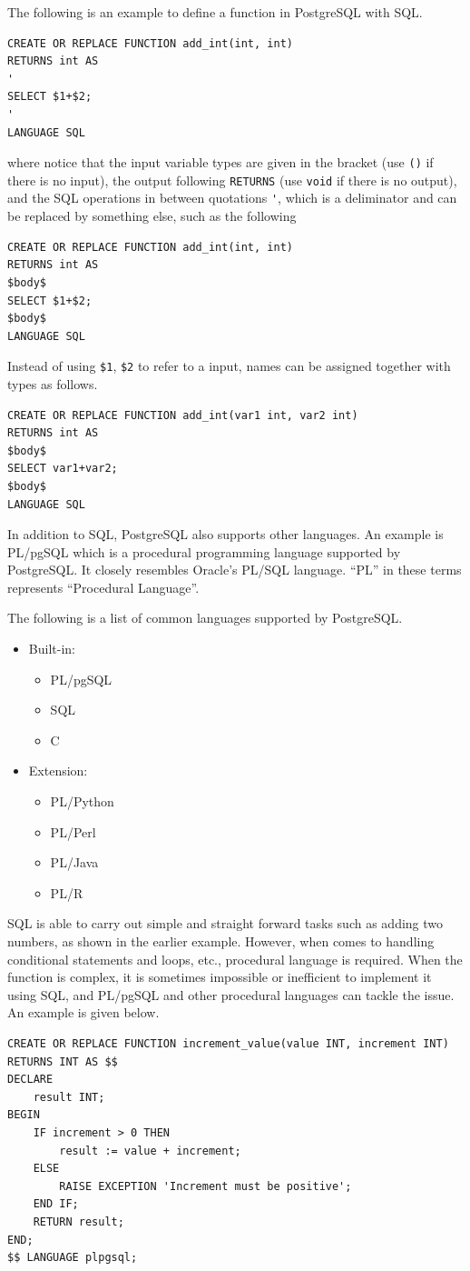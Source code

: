 The following is an example to define a function in PostgreSQL with SQL.
\begin{lstlisting}
CREATE OR REPLACE FUNCTION add_int(int, int)
RETURNS int AS
'
SELECT $1+$2;
'
LANGUAGE SQL
\end{lstlisting}
where notice that the input variable types are given in the bracket (use \verb|()| if there is no input), the output following \verb|RETURNS| (use \verb|void| if there is no output), and the SQL operations in between quotations \verb|'|, which is a deliminator and can be replaced by something else, such as the following
\begin{lstlisting}
CREATE OR REPLACE FUNCTION add_int(int, int)
RETURNS int AS
$body$
SELECT $1+$2;
$body$
LANGUAGE SQL
\end{lstlisting}

Instead of using \verb|$1|, \verb|$2| to refer to a input, names can be assigned together with types as follows.
\begin{lstlisting}
CREATE OR REPLACE FUNCTION add_int(var1 int, var2 int)
RETURNS int AS
$body$
SELECT var1+var2;
$body$
LANGUAGE SQL
\end{lstlisting}

In addition to SQL, PostgreSQL also supports other languages. An example is PL/pgSQL which is a procedural programming language supported by PostgreSQL. It closely resembles Oracle's PL/SQL language. ``PL'' in these terms represents ``Procedural Language''.

The following is a list of common languages supported by PostgreSQL.
\begin{itemize}
	\item Built-in:
	\begin{itemize}
		\item PL/pgSQL
		\item SQL
		\item C
	\end{itemize}
	\item Extension:
	\begin{itemize}
		\item PL/Python
		\item PL/Perl
		\item PL/Java
		\item PL/R
	\end{itemize}
\end{itemize}

SQL is able to carry out simple and straight forward tasks such as adding two numbers, as shown in the earlier example. However, when comes to handling conditional statements and loops, etc., procedural language is required. When the function is complex, it is sometimes impossible or inefficient to implement it using SQL, and PL/pgSQL and other procedural languages can tackle the issue. An example is given below.
\begin{lstlisting}
CREATE OR REPLACE FUNCTION increment_value(value INT, increment INT)
RETURNS INT AS $$
DECLARE
	result INT;
BEGIN
	IF increment > 0 THEN
		result := value + increment;
	ELSE
		RAISE EXCEPTION 'Increment must be positive';
	END IF;
	RETURN result;
END;
$$ LANGUAGE plpgsql;
\end{lstlisting}

